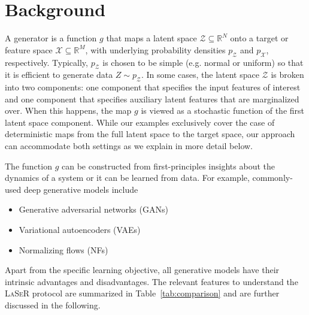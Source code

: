 \section{Background}
\label{sec:background}
A generator is a function $g$ that maps a latent space $\mathcal{Z}\subseteq \mathbb{R}^N$ onto a target or feature space $\mathcal{X}\subseteq \mathbb{R}^M$, with underlying probability densities $p_\mathcal{Z}$ and $p_\mathcal{X}$, respectively.  Typically, $p_\mathcal{Z}$ is chosen to be simple (e.g. normal or uniform) so that it is efficient to generate data $Z\sim p_\mathcal{Z}$.  In some cases, the latent space $\mathcal{Z}$ is broken into two components: one component that specifies the input features of interest and one component that specifies auxiliary latent features that are marginalized over.  When this happens, the map $g$ is viewed as a stochastic function of the first latent space component.  While our examples exclusively cover the case of deterministic maps from the full latent space to the target space, our approach can accommodate both settings as we explain in more detail below.

The function $g$ can be constructed from first-principles insights about the dynamics of a system or it can be learned from data.  For example, commonly-used deep generative models include

\begin{itemize}
    \item Generative adversarial networks (GANs)~\cite{Goodfellow:2014:GAN:2969033.2969125,Creswell2018}
    \item Variational autoencoders (VAEs)~\cite{kingma2014autoencoding,Kingma2019}
    \item Normalizing flows (NFs)~\cite{10.5555/3045118.3045281,Kobyzev2020} %
\end{itemize}

Apart from the specific learning objective, all generative models have their intrinsic advantages and disadvantages. The relevant features to understand the \textsc{LaSeR} protocol are summarized in Table~\ref{tab:comparison} and are further discussed in the following.

